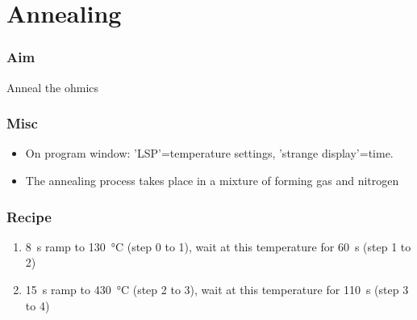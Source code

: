 \section{Annealing}
\subsubsection{Aim}
Anneal the ohmics

\subsubsection{Misc}
\begin{itemize}[noitemsep,nolistsep]
\item On program window: 'LSP'=temperature settings, 'strange display'=time.
\item The annealing process takes place in a mixture of forming gas and nitrogen
\end{itemize}

\subsubsection{Recipe}
\begin{enumerate}
\item \SI{8}{\second} ramp to \SI{130}{\degreeCelsius} (step 0 to 1), wait at this temperature for \SI{60}{\second} (step 1 to 2)
\item \SI{15}{\second} ramp to \SI{430}{\degreeCelsius} (step 2 to 3), wait at this temperature for \SI{110}{\second} (step 3 to 4)
\end{enumerate}

